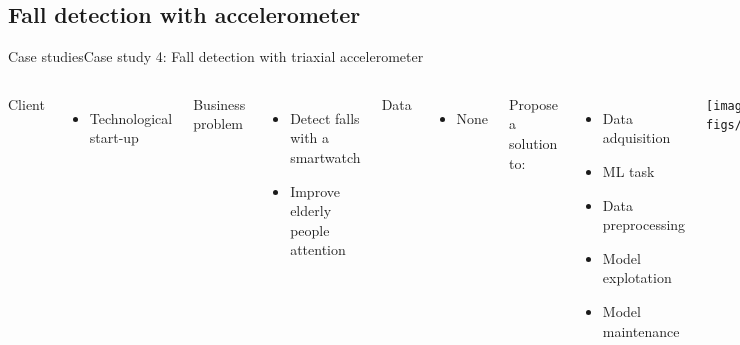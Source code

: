 \documentclass[10pt,compress]{beamer} %
\begin{document}
\subsection{Fall detection with accelerometer}
\begin{frame}{Case studies}{Case study 4: Fall detection with triaxial accelerometer}
    \begin{columns}
	   \small{
		Client
		\begin{itemize}
			\item Technological start-up
		\end{itemize}
		Business problem
		\begin{itemize}
			\item Detect falls with a smartwatch
			\item Improve elderly people attention
		\end{itemize}
		Data
		\begin{itemize}
			\item None
		\end{itemize}
		Propose a solution to:
		\begin{itemize}
			\item Data adquisition
			\item ML task
			\item Data preprocessing
			\item Model explotation
			\item Model maintenance
		\end{itemize}
		}
			\texttt{[image: figs/HFall.pdf]}

			\centering \href{https://www.slideshare.net/DavidFBarrero/triaxial-accelerometer-located-on-the-wrist-for-elderly-peoples-fall-detection}{(More info)}
    \end{columns}
\end{frame}
\end{document}
